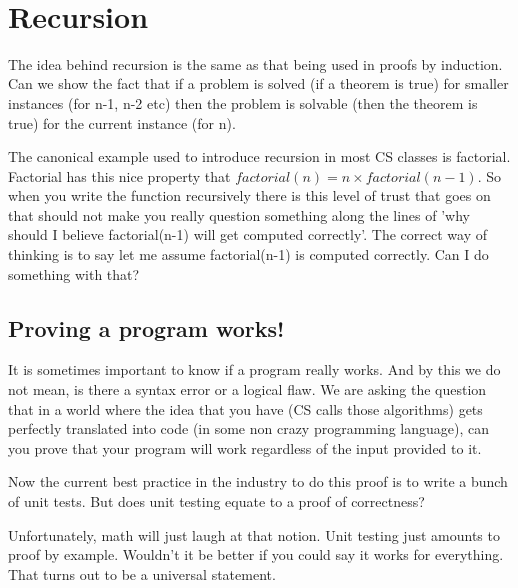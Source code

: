 \documentclass[12pt]{article}
\begin{document}
\begin{center}
\\
\vspace{1cm}
\end{center}

\vspace{0.5cm}\noindent


\section*{Recursion}
The idea behind recursion is the same as that being used in proofs by induction. Can we show the fact that if a problem is solved (if a theorem is true) for smaller instances (for n-1, n-2 etc) then the problem is solvable (then the theorem is true) for the current instance (for n).

The canonical example used to introduce recursion in most CS classes is factorial. Factorial has this nice property that $factorial(n) = n \times factorial(n-1)$. So when you write the function recursively there is this level of trust that goes on that should not make you really question something along the lines of 'why should I believe factorial(n-1) will get computed correctly'. The correct way of thinking is to say let me assume factorial(n-1) is computed correctly. Can I do something with that?

\subsection*{Proving a program works!}

It is sometimes important to know if a program really works. And by this we do not mean, is there a syntax error or a logical flaw. We are asking the question that in a world where the idea that you have (CS calls those algorithms) gets perfectly translated into code (in some non crazy programming language), can you prove that your program will work regardless of the input provided to it.

Now the current best practice in the industry to do this proof is to write a bunch of unit tests. But does unit testing equate to a proof of correctness?

Unfortunately, math will just laugh at that notion. Unit testing just amounts to proof by example. Wouldn't it be better if you could say it works for everything. That turns out to be a universal statement.

\medskip
\end{document}
